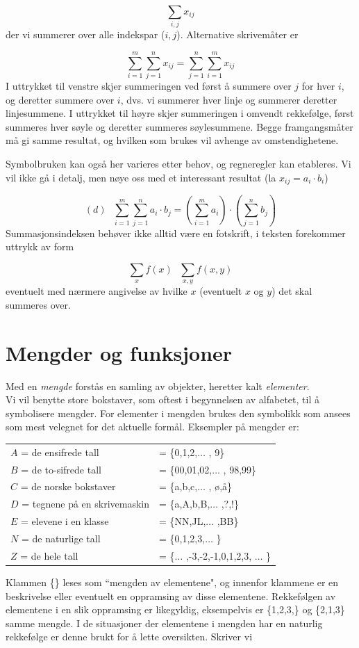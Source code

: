 \[               \sum_{i,j}x_{ij}     \]
der vi summerer over alle indekspar ($i,j$).  Alternative skrivemåter
er 

\[ \sum_{i=1}^m \sum_{j=1}^n x_{ij} = \sum_{j=1}^n \sum_{i=1}^m x_{ij} \]
I uttrykket til venstre skjer summeringen ved først å 
summere over $j$ for hver $i$, og deretter summere over $i$, dvs. vi
summerer hver linje og summerer deretter linjesummene.  I uttrykket
til høyre skjer summeringen i omvendt rekkefølge, først
summeres hver søyle og deretter summeres søylesummene.  Begge
framgangsmåter må gi samme resultat, og hvilken som brukes vil
avhenge av omstendighetene.

Symbolbruken kan også her varieres etter behov, og regneregler
kan etableres.  Vi vil ikke gå i detalj, men nøye oss med et
interessant resultat (la $x_{ij} = a_i\cdot b_i$)

\[ (d) \mbox{\ \ \ } \sum_{i=1}^m \sum_{j=1}^na_i\cdot b_j = (\sum_{i=1}^ma_i)\cdot
     (\sum_{j=1}^nb_j) \]
Summasjonsindeksen behøver ikke alltid være en fotskrift,
i teksten forekommer uttrykk av form

\[ \sum_x f(x) \mbox{\ \ \ } \sum_{x,y}f(x,y) \]
eventuelt med nærmere angivelse av hvilke $x$ (eventuelt $x$ og $y$)
det skal summeres over.


\section{Mengder og funksjoner}
                     
Med en {\em mengde} forstås en samling av objekter, heretter kalt
{\em elementer}.\\

Vi vil benytte store bokstaver, som oftest i begynnelsen av alfabetet, 
til å symbolisere mengder.  For elementer i mengden brukes den
symbolikk som ansees som mest velegnet for det aktuelle formål.
Eksempler på mengder er:
\begin{center}
\begin{tabular}{ll}
$A$ = de ensifrede tall              & = \{0,1,2,$\ldots$ , 9\} \\
$B$ = de to-sifrede tall             & = \{00,01,02,$\ldots$ , 98,99\} \\
$C$ = de norske bokstaver            & = \{a,b,c,$\ldots$ , ø,å\} \\
$D$ = tegnene på en skrivemaskin & = \{a,A,b,B,$\ldots$ ,?,!\} \\
$E$ = elevene i en klasse            & = \{NN,JL,$\ldots$ ,BB\} \\
$N$ = de naturlige tall              & = \{0,1,2,3,$\ldots$ \} \\
$Z$ = de hele tall                   & = \{$\ldots$ ,-3,-2,-1,0,1,2,3,
                                               $\ldots$ \}
\end{tabular} 
\end{center}
Klammen \{\} leses som ``mengden av elementene", og innenfor klammene er
en beskrivelse eller eventuelt en oppramsing av disse elementene.
Rekkefølgen av elementene i en slik oppramsing er likegyldig,
eksempelvis er \{1,2,3,\} og \{2,1,3\} samme mengde.  I de situasjoner der
elementene i mengden har en naturlig rekkefølge er denne brukt for
å lette oversikten.  Skriver vi

